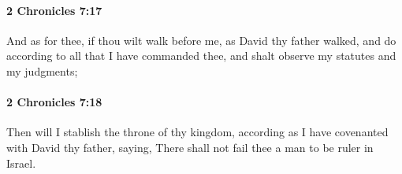 		\paragraph{2 Chronicles 7:17} %
			\label{2CHRONICLES-7-17}

			And as for thee, if thou wilt walk before me, as David thy father walked, and do according to all that I have commanded thee, and shalt observe my statutes and my judgments;


		\paragraph{2 Chronicles 7:18} %
			\label{2CHRONICLES-7-18}

			Then will I stablish the throne of thy kingdom, according as I have covenanted with David thy father, saying, There shall not fail thee a man to be ruler in Israel.


